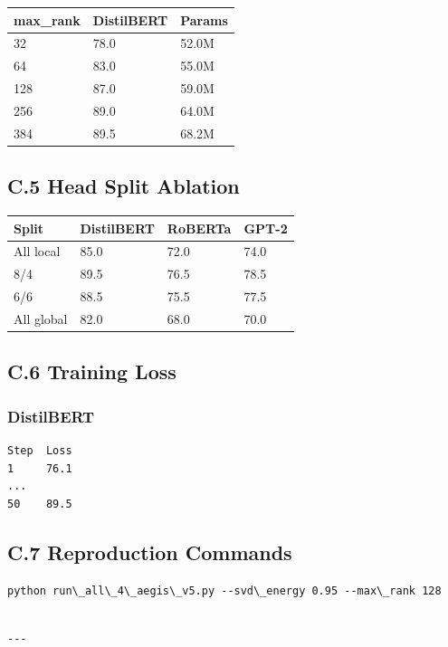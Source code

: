 \begin{table}[H]
\centering
\small
\begin{tabular}{lll}
\toprule
\textbf{max\_rank} & \textbf{DistilBERT} & \textbf{Params} \\
\midrule
32 & 78.0 & 52.0M \\
64 & 83.0 & 55.0M \\
128 & 87.0 & 59.0M \\
256 & 89.0 & 64.0M \\
384 & 89.5 & 68.2M \\
\bottomrule
\end{tabular}
\end{table}

\subsection{C.5 Head Split Ablation}

\begin{table}[H]
\centering
\small
\begin{tabular}{llll}
\toprule
\textbf{Split} & \textbf{DistilBERT} & \textbf{RoBERTa} & \textbf{GPT-2} \\
\midrule
All local & 85.0 & 72.0 & 74.0 \\
8/4 & 89.5 & 76.5 & 78.5 \\
6/6 & 88.5 & 75.5 & 77.5 \\
All global & 82.0 & 68.0 & 70.0 \\
\bottomrule
\end{tabular}
\end{table}

\subsection{C.6 Training Loss}

\subsubsection{DistilBERT}
\begin{lstlisting}
Step  Loss
1     76.1
...
50    89.5
\end{lstlisting}

\subsection{C.7 Reproduction Commands}

\begin{lstlisting}
python run\_all\_4\_aegis\_v5.py --svd\_energy 0.95 --max\_rank 128
\end{lstlisting}
\begin{lstlisting}

---
\end{lstlisting}

